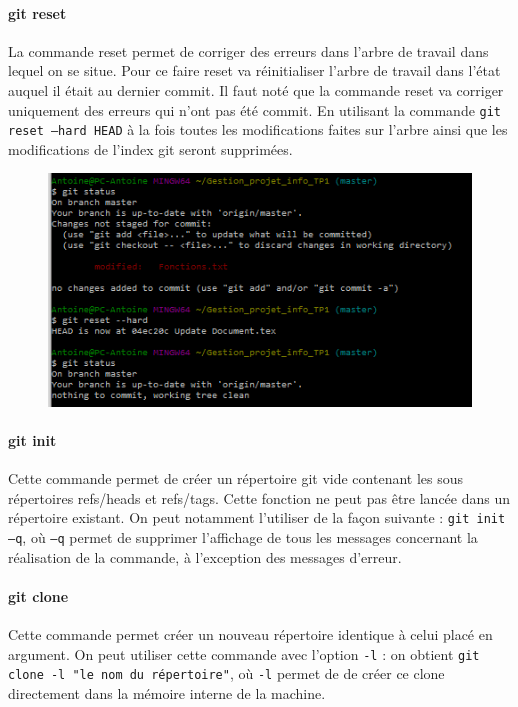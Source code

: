 \documentclass[11pt,canadien]{article}
\begin{document}
\paragraph{git reset}La commande reset permet de corriger des erreurs dans l'arbre de travail dans lequel on se situe. Pour ce faire reset va réinitialiser l'arbre de travail dans l'état auquel il était au dernier commit. Il faut noté que la commande reset va corriger uniquement des erreurs qui n'ont pas été commit. En utilisant la commande \texttt{git reset --hard HEAD} à la fois toutes les modifications faites sur l'arbre ainsi que les modifications de l'index git seront supprimées.
\begin{figure}[H]
	\centering
	\includegraphics{images/git_reset.png}
\end{figure}

\paragraph{git init}Cette commande permet de créer un répertoire git vide contenant les sous répertoires refs/heads et refs/tags. Cette fonction ne peut pas être lancée dans un répertoire existant. On peut notamment l’utiliser de la façon suivante : \texttt{git init –q}, où \texttt{–q} permet de supprimer l’affichage de tous les messages concernant la réalisation de la commande, à l’exception des messages d’erreur.

\paragraph{git clone}Cette commande permet créer un nouveau répertoire identique à celui placé en argument. On peut utiliser cette commande avec l’option \texttt{-l} : on obtient \texttt{git clone -l "le nom du répertoire"}, où \texttt{-l} permet de de créer ce clone directement dans la mémoire interne de la machine.
\end{document}
